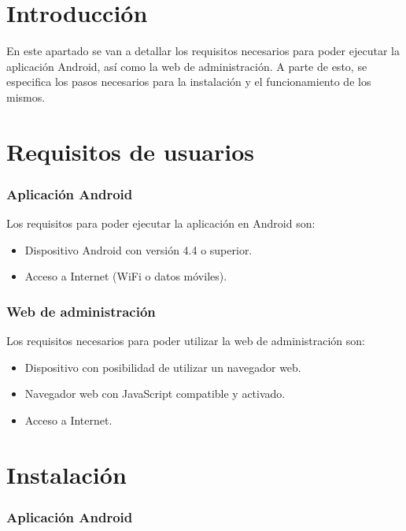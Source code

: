 
\section{Introducción}

En este apartado se van a detallar los requisitos necesarios para poder ejecutar la aplicación Android, así como la web de administración. A parte de esto, se especifica los pasos necesarios para la instalación y el funcionamiento de los mismos.

\section{Requisitos de usuarios}

\subsubsection{Aplicación Android}

Los requisitos para poder ejecutar la aplicación en Android son:

\begin{itemize}
	\tightlist
	\item 
	Dispositivo Android con versión 4.4 o superior.
	\item 
	Acceso a Internet (WiFi o datos móviles).
\end{itemize}

\subsubsection{Web de administración}

Los requisitos necesarios para poder utilizar la web de administración son:

\begin{itemize}
	\tightlist
	\item 
	Dispositivo con posibilidad de utilizar un navegador web.
	\item 
	Navegador web con JavaScript compatible y activado.
	\item 
	Acceso a Internet.
\end{itemize}

\section{Instalación}

\subsubsection{Aplicación Android}

